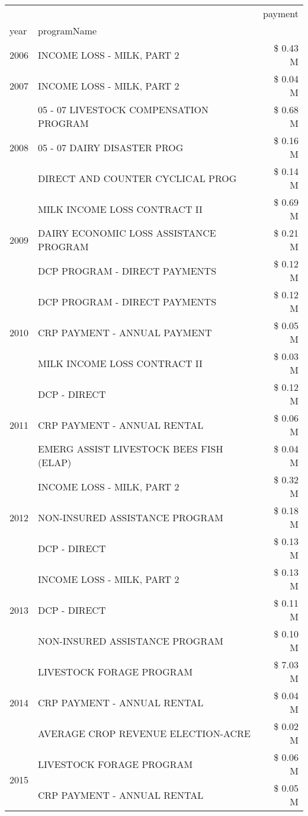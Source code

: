 \begin{tabular}{llr}
\toprule
 &  & payment \\
year & programName &  \\
\midrule
2006 & INCOME LOSS - MILK, PART 2 & \$ 0.43 M \\
\cline{1-3}
2007 & INCOME LOSS - MILK, PART 2 & \$ 0.04 M \\
\cline{1-3}
\multirow[t]{3}{*}{2008} & 05 - 07 LIVESTOCK COMPENSATION PROGRAM & \$ 0.68 M \\
 & 05 - 07 DAIRY DISASTER PROG & \$ 0.16 M \\
 & DIRECT AND COUNTER CYCLICAL PROG & \$ 0.14 M \\
\cline{1-3}
\multirow[t]{3}{*}{2009} & MILK INCOME LOSS CONTRACT II & \$ 0.69 M \\
 & DAIRY ECONOMIC LOSS ASSISTANCE PROGRAM & \$ 0.21 M \\
 & DCP PROGRAM - DIRECT PAYMENTS & \$ 0.12 M \\
\cline{1-3}
\multirow[t]{3}{*}{2010} & DCP PROGRAM - DIRECT PAYMENTS & \$ 0.12 M \\
 & CRP PAYMENT - ANNUAL PAYMENT & \$ 0.05 M \\
 & MILK INCOME LOSS CONTRACT II & \$ 0.03 M \\
\cline{1-3}
\multirow[t]{3}{*}{2011} & DCP - DIRECT & \$ 0.12 M \\
 & CRP PAYMENT - ANNUAL RENTAL & \$ 0.06 M \\
 & EMERG ASSIST LIVESTOCK BEES FISH (ELAP) & \$ 0.04 M \\
\cline{1-3}
\multirow[t]{3}{*}{2012} & INCOME LOSS - MILK, PART 2 & \$ 0.32 M \\
 & NON-INSURED ASSISTANCE PROGRAM & \$ 0.18 M \\
 & DCP - DIRECT & \$ 0.13 M \\
\cline{1-3}
\multirow[t]{3}{*}{2013} & INCOME LOSS - MILK, PART 2 & \$ 0.13 M \\
 & DCP - DIRECT & \$ 0.11 M \\
 & NON-INSURED ASSISTANCE PROGRAM & \$ 0.10 M \\
\cline{1-3}
\multirow[t]{3}{*}{2014} & LIVESTOCK FORAGE PROGRAM & \$ 7.03 M \\
 & CRP PAYMENT - ANNUAL RENTAL & \$ 0.04 M \\
 & AVERAGE CROP REVENUE ELECTION-ACRE & \$ 0.02 M \\
\cline{1-3}
\multirow[t]{3}{*}{2015} & LIVESTOCK FORAGE PROGRAM & \$ 0.06 M \\
 & CRP PAYMENT - ANNUAL RENTAL & \$ 0.05 M \\

\end{tabular}
